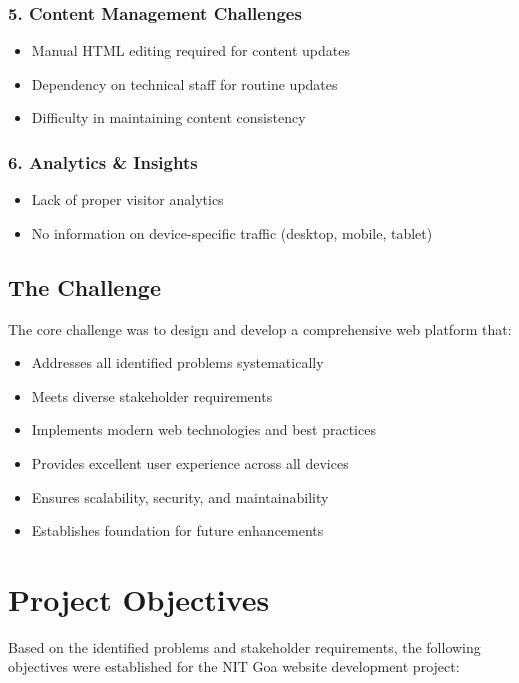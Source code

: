 \documentclass[12pt,a4paper]{report}
\begin{document}
\subsubsection*{5. Content Management Challenges}
\begin{itemize}
    \item Manual HTML editing required for content updates
    \item Dependency on technical staff for routine updates
    \item Difficulty in maintaining content consistency
\end{itemize}

\subsubsection*{6. Analytics \& Insights}
\begin{itemize}
    \item Lack of proper visitor analytics
    \item No information on device-specific traffic (desktop, mobile, tablet)
\end{itemize}

\subsection*{The Challenge}

The core challenge was to design and develop a comprehensive web platform that:
\begin{itemize}
    \item Addresses all identified problems systematically
    \item Meets diverse stakeholder requirements
    \item Implements modern web technologies and best practices
    \item Provides excellent user experience across all devices
    \item Ensures scalability, security, and maintainability
    \item Establishes foundation for future enhancements
\end{itemize}

\section{Project Objectives}

Based on the identified problems and stakeholder requirements, the following objectives were established for the NIT Goa website development project:
\end{document}
